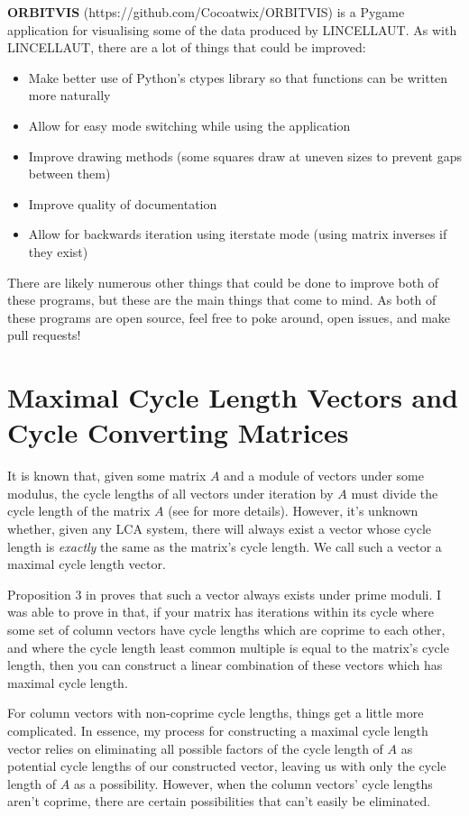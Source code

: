 \documentclass[a4paper, 12pt, reqno]{amsart}
\newcommand{\ssection}[1]{\vspace{1cm}\section{#1}}
\begin{document}
		\textbf{ORBITVIS} (https://github.com/Cocoatwix/ORBITVIS) is a Pygame application for visualising
		some of the data produced by LINCELLAUT. As with LINCELLAUT, there are a lot of things that could
		be improved:
		\begin{itemize}
			\item Make better use of Python's ctypes library so that functions can be written more naturally
			\item Allow for easy mode switching while using the application
			\item Improve drawing methods (some squares draw at uneven sizes to prevent gaps between them)
			\item Improve quality of documentation
			\item Allow for backwards iteration using iterstate mode (using matrix inverses if they exist)
		\end{itemize}
		
		There are likely numerous other things that could be done to improve both of these programs, but 
		these are the main things that come to mind. As both of these programs are open source, feel free
		to poke around, open issues, and make pull requests!
		
	\ssection{Maximal Cycle Length Vectors and Cycle Converting Matrices}
		It is known that, given some matrix $A$ and a module of vectors under some modulus, the cycle
		lengths of all vectors under iteration by $A$ must divide the cycle length of the matrix $A$ (see
		\citet{Strong2022maximal} for more details). However, it's unknown whether, given any LCA system, there
		will always exist a vector whose cycle length is \emph{exactly} the same as the matrix's cycle
		length.	We call such a vector a maximal cycle length vector.
		
		Proposition 3 in \citet{Mendivil2012} proves that such a vector always exists under prime moduli.
		I was able to prove in \citet{Strong2022maximal} that, if your matrix has iterations within its cycle where
		some set of column vectors have cycle lengths which are coprime to each other, and where the cycle
		length least common multiple is equal to the matrix's cycle length, then you can construct a linear
		combination of these vectors which has maximal cycle length. 
		
		For column vectors with non-coprime cycle lengths, things get a little more complicated. In essence, 
		my process for constructing a maximal cycle length vector relies on eliminating all possible factors 
		of the cycle length of $A$ as potential cycle lengths of our constructed vector, leaving us with only
		the cycle length of $A$ as a possibility. However, when the column vectors' cycle lengths aren't coprime,
		there are certain possibilities that can't easily be eliminated.
		
\end{document}
